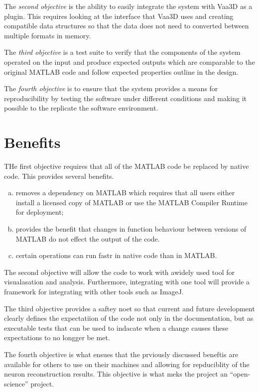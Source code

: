 The \emph{second objective} is the ability to easily integrate the system with
Vaa3D as a plugin. This requires looking at the interface that
Vaa3D uses and creating compatible data structures so that the
data does not need to converted between multiple formats in
memory.

The \emph{third objective} is a test suite to verify that the
components of the system operated on the input and produce 
expected outputs which are comparable to the original MATLAB code
and follow expected properties outline in the design.

The \emph{fourth objective} is to ensure that the system provides
a means for reproducibility by testing the software under different
conditions and making it possible to the replicate the software
environment.

\section{Benefits}

THe first objective requires that all of the MATLAB code be
replaced by native code. This provides several benefits.
\begin{enumerate}[a)]
	\item removes a dependency on MATLAB which requires that
		all users either install a licensed copy of MATLAB
		or use the MATLAB Compiler Runtime for deployment;
	\item provides the benefit that changes in
		function behaviour between versions of
		MATLAB do not effect the output of the
		code.
	\item certain operations can run fastr in native code than
		in MATLAB.
\end{enumerate}

The second objective will allow the code to work with awidely used
tool for visualasation and analysis. Furthermore, integrating with
one tool will provide a framework for integrating with other tools
such as ImageJ. %

The third objective provides a saftey noet so that current and
future development clearly defines the expectatiion of the code
not only in the documentation, but as executable tests that can be
used to indacate when a change causes these expectations to no
longger be met.

The fourth objective is what ensues that the prviously discussed
beneftis are available for others to use on their machines and
allowing for repduciblity of the neuron reconstruction results.
This objective is what meks the project an ``open-science''
project.


